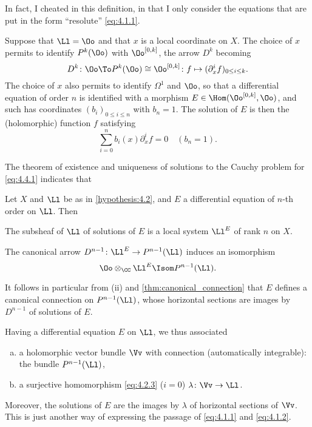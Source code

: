 In fact, I cheated in this definition, in that I only consider the equations
that are put in the form ``resolute'' \cref{eq:4.1.1}.

\begin{para}\label{hypothesis:4.4}
  Suppose that $\Ll=\Oo$ and that $x$ is a local coordinate on $X$. The choice
  of $x$ permits to identify $P^k(\Oo)$ with $\Oo^{[0,k]}$, the arrow $D^k$
  becoming
  \[
  D^k\colon\Oo\To P^k(\Oo)\cong\Oo^{[0,k]}\colon
  f\mapsto(\partial_x^if)_{0\le i\le k}.
  \]
  The choice of $x$ also permits to identify $\Omega^1$ and $\Oo$, so that a
  differential equation of order $n$ is identified with a morphism
  $E\in\Hom(\Oo^{[0,k]},\Oo)$, and such has coordinates $(b_i)_{0\le i\le n}$
  with $b_n=1$. The solution of $E$ is then the (holomorphic) function $f$
  satisfying
  \begin{equation}\label{eq:4.4.1}
    \sum_{i=0}^n b_i(x)\partial_x^if=0\quad(b_n=1).
  \end{equation}
\end{para}

The theorem of existence and uniqueness of solutions to the Cauchy problem
for \cref{eq:4.4.1} indicates that
\begin{theorem}[Cauchy]
  Let $X$ and $\Ll$ be as in \ref{hypothesis:4.2}, and $E$ a differential
  equation of $n$-th order on $\Ll$. Then
  \begin{proplist}
    \item The subsheaf of $\Ll$ of solutions of $E$ is a local system $\Ll^E$
    of rank $n$ on $X$.
    \item The canonical arrow $D^{n-1}\colon\Ll^E\to P^{n-1}(\Ll)$ induces an
    isomorphism
    \[
    \Oo\otimes_\CC\Ll^E\Isom P^{n-1}(\Ll).
    \]
  \end{proplist}
\end{theorem}

It follows in particular from (ii) and \ref{thm:canonical_connection} that $E$
defines a canonical connection on $P^{n-1}(\Ll)$, whose horizontal sections are
images by $D^{n-1}$ of solutions of $E$.

\begin{para}\label{hypothesis:4.6}
  Having a differential equation $E$ on $\Ll$, we thus associated
  \begin{enumerate}[a)]
    \item a holomorphic vector bundle $\Vv$ with connection (automatically
    integrable): the bundle $P^{n-1}(\Ll)$,
    \item a surjective homomorphism \cref{eq:4.2.3} ($i=0$)
    $\lambda\colon\Vv\to\Ll$.
  \end{enumerate}

  Moreover, the solutions of $E$ are the images by $\lambda$ of horizontal
  sections of $\Vv$.
  This is just another way of expressing the passage of \ref{eq:4.1.1} and
  \ref{eq:4.1.2}.
\end{para}

